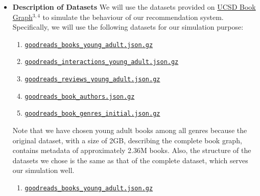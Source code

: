 \documentclass[fontsize=11pt]{article}
\begin{document}
\begin{itemize}
\item \textbf{Description of Datasets }We will use the datasets provided on \href{https://sites.google.com/eng.ucsd.edu/ucsdbookgraph/home}{UCSD Book Graph}$^{3, 4}$ to simulate the behaviour of our recommendation system. Specifically, we will use the following datasets for our simulation purpose:
\begin{enumerate}
\item
\texttt{\href{https://drive.google.com/uc?id=1gH7dG4yQzZykTpbHYsrw2nFknjUm0Mol}{goodreads\_books\_young\_adult.json.gz}}
\item 
\texttt{\href{https://drive.google.com/uc?id=1NNX7SWcKahezLFNyiW88QFPAqOAYP5qg}{goodreads\_interactions\_young\_adult.json.gz}}
\item 
\texttt{\href{https://drive.google.com/uc?id=1M5iqCZ8a7rZRtsmY5KQ5rYnP9S0bQJVo}{goodreads\_reviews\_young\_adult.json.gz}}
\item 
\texttt{\href{https://drive.google.com/uc?id=19cdwyXwfXx_HDIgxXaHzH0mrx8nMyLvC}{goodreads\_book\_authors.json.gz}}
\item 
\texttt{\href{https://drive.google.com/uc?id=1ah0_KpUterVi-AHxJ03iKD6O0NfbK0md}{goodreads\_book\_genres\_initial.json.gz}}
\end{enumerate}
Note that we have chosen young adult books among all genres because the original dataset, with a size of 2GB, describing the complete book graph, contains metadata of approximately 2.36M books. Also, the structure of the datasets we chose is the same as that of the complete dataset, which serves our simulation well.
\begin{enumerate}
\item \texttt{\href{https://drive.google.com/uc?id=1gH7dG4yQzZykTpbHYsrw2nFknjUm0Mol}{goodreads\_books\_young\_adult.json.gz}}
 

\end{enumerate}
\end{itemize}
\end{document}
